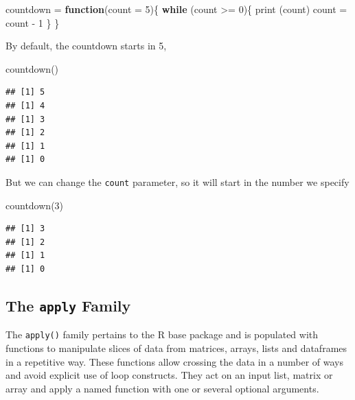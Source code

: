 \documentclass[
]{book}
\newenvironment{Shaded}{\begin{snugshade}}{\end{snugshade}}
\newcommand{\AttributeTok}[1]{\textcolor[rgb]{0.77,0.63,0.00}{#1}}
\newcommand{\ControlFlowTok}[1]{\textcolor[rgb]{0.13,0.29,0.53}{\textbf{#1}}}
\newcommand{\DecValTok}[1]{\textcolor[rgb]{0.00,0.00,0.81}{#1}}
\newcommand{\FunctionTok}[1]{\textcolor[rgb]{0.00,0.00,0.00}{#1}}
\newcommand{\NormalTok}[1]{#1}
\newcommand{\OtherTok}[1]{\textcolor[rgb]{0.56,0.35,0.01}{#1}}
\newcommand{\SpecialCharTok}[1]{\textcolor[rgb]{0.00,0.00,0.00}{#1}}
\theoremstyle{definition}
\theoremstyle{definition}
\theoremstyle{definition}
\theoremstyle{definition}
\theoremstyle{remark}
\begin{document}
\begin{Shaded}
\begin{Highlighting}[]
\NormalTok{countdown }\OtherTok{=} \ControlFlowTok{function}\NormalTok{(}\AttributeTok{count =} \DecValTok{5}\NormalTok{)\{}
  \ControlFlowTok{while}\NormalTok{ (count }\SpecialCharTok{\textgreater{}=} \DecValTok{0}\NormalTok{)\{}
    \FunctionTok{print}\NormalTok{ (count)}
\NormalTok{    count }\OtherTok{=}\NormalTok{ count }\SpecialCharTok{{-}} \DecValTok{1}
\NormalTok{  \}}
\NormalTok{\}}
\end{Highlighting}
\end{Shaded}

By default, the countdown starts in 5,

\begin{Shaded}
\begin{Highlighting}[]
\FunctionTok{countdown}\NormalTok{()}
\end{Highlighting}
\end{Shaded}

\begin{verbatim}
## [1] 5
## [1] 4
## [1] 3
## [1] 2
## [1] 1
## [1] 0
\end{verbatim}

But we can change the \texttt{count} parameter, so it will start in the number we specify

\begin{Shaded}
\begin{Highlighting}[]
\FunctionTok{countdown}\NormalTok{(}\DecValTok{3}\NormalTok{)}
\end{Highlighting}
\end{Shaded}

\begin{verbatim}
## [1] 3
## [1] 2
## [1] 1
## [1] 0
\end{verbatim}

\hypertarget{the-apply-family}{%
\subsection{\texorpdfstring{The \texttt{apply} Family}{The apply Family}}\label{the-apply-family}}

The \texttt{apply()} family pertains to the R base package and is populated with functions to manipulate slices of data from matrices, arrays, lists and dataframes in a repetitive way. These functions allow crossing the data in a number of ways and avoid explicit use of loop constructs. They act on an input list, matrix or array and apply a named function with one or several optional arguments.
\end{document}

